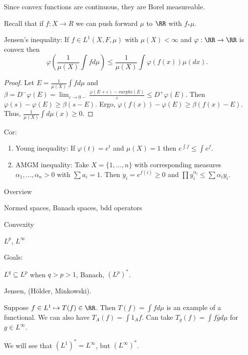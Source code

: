 \documentclass{../uva7310}
\begin{document}
Since convex functions are continuous, they are Borel measureable.

Recall that if $f:X\rightarrow R$ we can push forward $\mu$ to $\RR$ with $f_*\mu$.

Jensen's inequality: If $f\in L^1(X,F,\mu)$ with $\mu(X)<\infty$ and $\varphi:\RR\rightarrow\RR$ is convex then
\[
    \varphi\left(\frac{1}{\mu(X)}\int fd\mu\right)\leq \frac{1}{\mu(X)}\int \varphi(f(x))\mu(dx).
\]
\begin{proof}
    Let $E=\frac{1}{\mu(X)}\int fd\mu$ and $\beta=D^-\varphi(E)=\lim_{\varepsilon\to 0-}\frac{\varphi(E+\varepsilon)-varphi(E)}{\varepsilon}\leq D^+\varphi(E)$.
    Then $\varphi(s)-\varphi(E)\geq \beta(s-E)$. Ergo, $\varphi(f(x))-\varphi(E)\geq\beta(f(x)-E)$. Thus, $\frac{1}{\mu(X)}\int d\mu(x)\geq 0$.
\end{proof}

Cor:
\begin{enumerate}
    \item Young inequality: If $\varphi(t)=e^t$ and $\mu(X)=1$ then $e^{\int f}\leq \int e^f$.
    \item AMGM inequality: Take $X=\{1,\ldots, n\}$ with corresponding measures $\alpha_1,\ldots,\alpha_n>0$ with $\sum a_i=1$.
    Then $y_i=e^{f(i)}\geq 0$ and $\prod y_i^{\alpha_i} \leq \sum \alpha_i y_i$.
\end{enumerate}

Overview

Normed spaces, Banach spaces, bdd operators

Convexity

$L^p$, $L^\infty$

Goals:

$L^q\subseteq L^p$ when $q>p>1$, Banach, $(L^p)^*$.

Jensen, (H\"older, Minkowski).

Suppose $f\in L^1\mapsto T(f)\in\RR$. Then $T(f)=\int f d\mu$ is an example of a functional. We can also have $T_A(f)=\int 1_A f$.
Can take $T_g(f)=\int f\bar{g} d\mu$ for $g\in L^\infty$.

We will see that $(L^1)^*=L^\infty$, but $(L^\infty)^*$.
\end{document}
